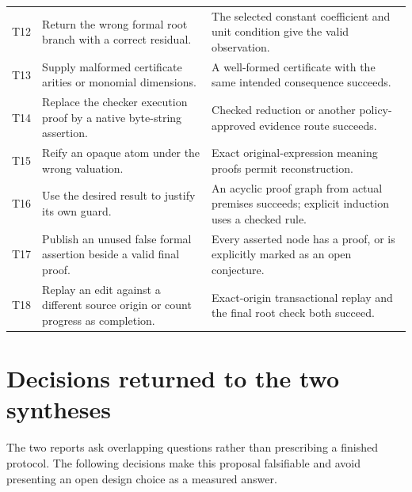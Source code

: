 \documentclass[11pt,letterpaper]{article}
\theoremstyle{remark}
\begin{document}
\begin{longtable}{@{}P{.35in}P{2.60in}P{3.05in}@{}}
T12 & Return the wrong formal root branch with a correct residual.
& The selected constant coefficient and unit condition give the valid observation.\\
T13 & Supply malformed certificate arities or monomial dimensions.
& A well-formed certificate with the same intended consequence succeeds.\\
T14 & Replace the checker execution proof by a native byte-string assertion.
& Checked reduction or another policy-approved evidence route succeeds.\\
T15 & Reify an opaque atom under the wrong valuation.
& Exact original-expression meaning proofs permit reconstruction.\\
T16 & Use the desired result to justify its own guard.
& An acyclic proof graph from actual premises succeeds; explicit induction uses a checked rule.\\
T17 & Publish an unused false formal assertion beside a valid final proof.
& Every asserted node has a proof, or is explicitly marked as an open conjecture.\\
T18 & Replay an edit against a different source origin or count progress as completion.
& Exact-origin transactional replay and the final root check both succeed.\\
\bottomrule
\end{longtable}
\normalsize

\section{Decisions returned to the two syntheses}\label{sec:decisions}

The two reports ask overlapping questions rather than prescribing a finished
protocol. The following decisions make this proposal falsifiable and avoid
presenting an open design choice as a measured answer.
\end{document}
